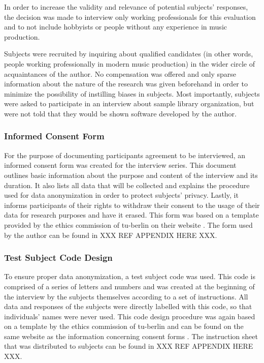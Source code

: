\smallskip

In order to increase the validity and relevance of potential subjects'
responses, the decision was made to interview only working professionals for
this evaluation and to not include hobbyists or people without any experience in
music production.

\smallskip

Subjects were recruited by inquiring about qualified candidates (in other words,
people working professionally in modern music production) in the wider circle of
acquaintances of the author. No compensation was offered and only sparse
information about the nature of the research was given beforehand in order to
minimize the possibility of instilling biases in subjects. Most importantly,
subjects were asked to participate in an interview about sample library
organization, but were not told that they would be shown software developed by
the author.

\subsubsection{Informed Consent Form}
\label{subsubsec:consent_form}
For the purpose of documenting participants agreement to be interviewed, an
informed consent form was created for the interview series. This document
outlines basic information about the purpose and content of the interview and
its duration. It also lists all data that will be collected and explains the
procedure used for data anonymization in order to protect subjects' privacy.
Lastly, it informs participants of their rights to withdraw their consent to the
usage of their data for research purposes and have it erased. This form was
based on a template provided by the ethics commission of \gls{tu-berlin} on
their website \citep{web:ethics2019}. The form used by the author can be found
in
XXX REF APPENDIX HERE XXX.

\subsubsection{Test Subject Code Design}
\label{subsubsec:subject_code}
To ensure proper data anonymization, a test subject code was used. This code
is comprised of a series of letters and numbers and was created at the beginning
of the interview by the subjects themselves according to a set of instructions.
All data and responses of the subjects were directly labelled with this code, so
that individuals' names were never used. This code design procedure was again
based on a template by the ethics commission of \gls{tu-berlin} and can be found
on the same website as the information concerning consent forms
\citep{web:ethics2019}. The instruction sheet that was distributed to subjects
can be found in
XXX REF APPENDIX HERE XXX.

